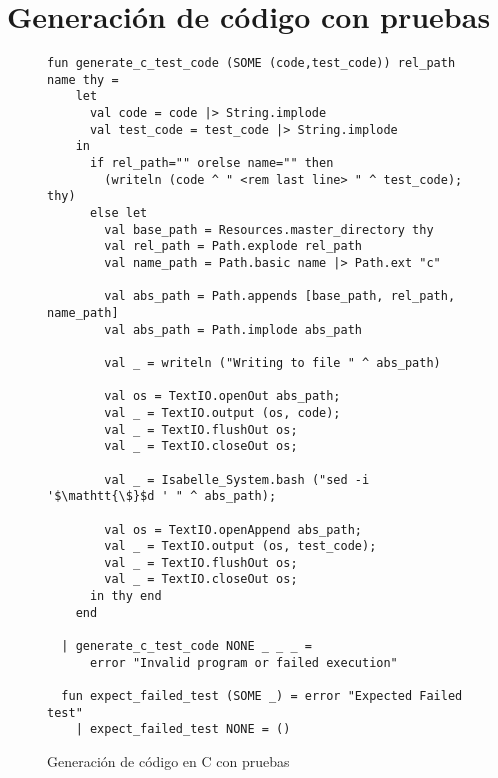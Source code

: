 \chapter{Generación de código con pruebas}
\label{ap:generate_c_test_code}

\begin{figure}
\begin{lstlisting}[mathescape=true]
  fun generate_c_test_code (SOME (code,test_code)) rel_path name thy =
    let
      val code = code |> String.implode
      val test_code = test_code |> String.implode
    in
      if rel_path="" orelse name="" then
        (writeln (code ^ " <rem last line> " ^ test_code); thy)
      else let
        val base_path = Resources.master_directory thy
        val rel_path = Path.explode rel_path
        val name_path = Path.basic name |> Path.ext "c"

        val abs_path = Path.appends [base_path, rel_path, name_path]
        val abs_path = Path.implode abs_path

        val _ = writeln ("Writing to file " ^ abs_path)

        val os = TextIO.openOut abs_path;
        val _ = TextIO.output (os, code);
        val _ = TextIO.flushOut os;
        val _ = TextIO.closeOut os;

        val _ = Isabelle_System.bash ("sed -i '$\mathtt{\$}$d ' " ^ abs_path);

        val os = TextIO.openAppend abs_path;
        val _ = TextIO.output (os, test_code);
        val _ = TextIO.flushOut os;
        val _ = TextIO.closeOut os;
      in thy end
    end

  | generate_c_test_code NONE _ _ _ =
      error "Invalid program or failed execution"

  fun expect_failed_test (SOME _) = error "Expected Failed test"
    | expect_failed_test NONE = ()
\end{lstlisting}
\caption{Generación de código en C con pruebas}
\end{figure}
